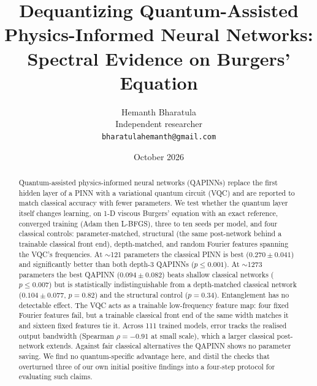 \documentclass[11pt]{article}
\title{\textbf{Dequantizing Quantum-Assisted\\ Physics-Informed Neural Networks:\\
Spectral Evidence on Burgers' Equation}}
\author{Hemanth Bharatula\\
\small Independent researcher\\
\small \texttt{bharatulahemanth@gmail.com}}
\date{October 2026}
\begin{document}
\maketitle

\begin{abstract}
Quantum-assisted physics-informed neural networks (QAPINNs) replace the first hidden
layer of a PINN with a variational quantum circuit (VQC) and are reported to match
classical accuracy with fewer parameters. We test whether the quantum layer itself
changes learning, on 1-D viscous Burgers' equation with an exact reference, converged
training (Adam then L-BFGS), three to ten seeds per model, and four classical controls:
parameter-matched, structural (the same post-network behind a trainable classical front
end), depth-matched, and random Fourier features spanning the VQC's frequencies. At
$\sim$121 parameters the classical PINN is best ($0.270\pm0.041$) and significantly
better than both depth-3 QAPINNs ($p\le0.001$). At $\sim$1273 parameters the best QAPINN
($0.094\pm0.082$) beats shallow classical networks ($p\le0.007$) but is statistically
indistinguishable from a depth-matched classical network ($0.104\pm0.077$, $p=0.82$) and
the structural control ($p=0.34$). Entanglement has no detectable effect. The VQC acts as
a trainable low-frequency feature map: four fixed Fourier features fail, but a trainable
classical front end of the same width matches it and sixteen fixed features tie it.
Across 111 trained models, error tracks the realised output bandwidth (Spearman
$\rho=-0.91$ at small scale), which a larger classical post-network extends. Against fair
classical alternatives the QAPINN shows no parameter saving. We find no quantum-specific
advantage here, and distil the checks that overturned three of our own initial positive
findings into a four-step protocol for evaluating such claims.
\end{abstract}

\end{document}
